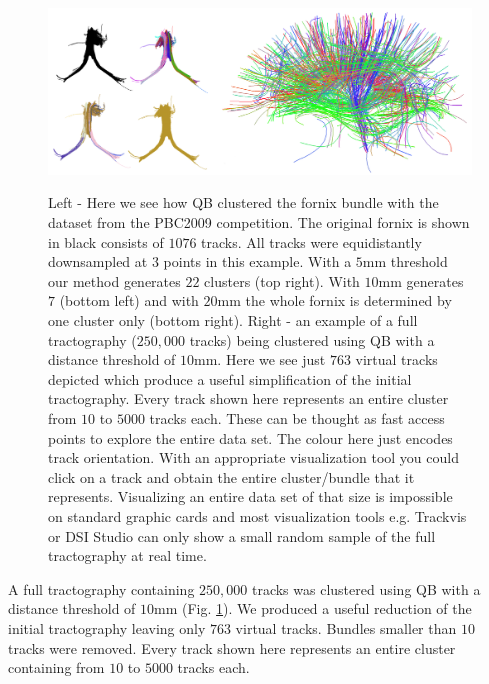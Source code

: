 \documentclass[preprint,authoryear,a4paper,10pt,onecolumn]{elsarticle}
\begin{document}
%
\begin{figure}
\begin{centering}
\includegraphics[scale=0.6]{last_figures/LSC_simple}
\par\end{centering}

\caption{Left - Here we see how QB clustered the fornix bundle with the
  dataset from the PBC2009 competition. The original fornix is shown in
  black consists of $1076$ tracks. All tracks were equidistantly
  downsampled at $3$ points in this example. With a $5$mm threshold our
  method generates $22$ clusters (top right). With $10$mm generates $7$
  (bottom left) and with $20$mm the whole fornix is determined by one
  cluster only (bottom right). Right - an example of a full tractography
  ($250,000$ tracks) being clustered using QB with a distance threshold
  of $10$mm. Here we see just $763$ virtual tracks depicted which
  produce a useful simplification of the initial tractography. Every
  track shown here represents an entire cluster from $10$ to $5000$
  tracks each. These can be thought as fast access points to explore the
  entire data set. The colour here just encodes track orientation.  With
  an appropriate visualization tool you could click on a track and
  obtain the entire cluster/bundle that it represents. Visualizing an
  entire data set of that size is impossible on standard graphic cards
  and most visualization tools e.g. Trackvis or DSI Studio can only show
  a small random sample of the full tractography at real time.}


\centering{}\label{Flo:QB_fornix}
\end{figure}


A full tractography containing $250,000$ tracks was clustered using QB
with a distance threshold of $10$mm (Fig. \ref{Flo:QB_fornix}).  We
produced a useful reduction of the initial tractography leaving only
$763$ virtual tracks. Bundles smaller than $10$ tracks were
removed. Every track shown here represents an entire cluster containing
from $10$ to $5000$ tracks each.
\end{document}

